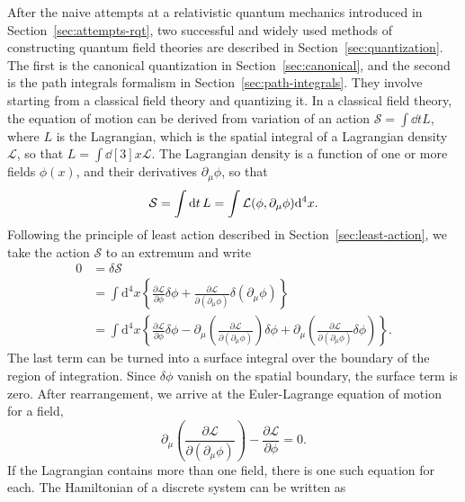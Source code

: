 After the naive attempts at a relativistic quantum mechanics introduced in Section~\ref{sec:attempts-rqt}, two successful and widely used methods of constructing quantum field theories are described in Section~\ref{sec:quantization}. The first is the canonical quantization in Section~\ref{sec:canonical}, and the second is the path integrals formalism in Section~\ref{sec:path-integrals}. They involve starting from a classical field theory and quantizing it. In a classical field theory, the equation of motion can be derived from variation of an action $\mathcal{S}=\int \dd{t}L$, where $L$ is the Lagrangian, which is the spatial integral of a Lagrangian density $\mathcal{L}$, so that $L=\int \dd[3]x\mathcal{L}$. The Lagrangian density is a function of one or more fields $\phi(x)$, and their derivatives $\partial_{\mu}\phi$, so that
\begin{equation}
\mathcal{S}=\int \dd{t}L=\int \mathcal{L}\qty(\phi,\partial_{\mu}\phi)\dd[4]x.
\end{equation}
Following the principle of least action described in Section~\ref{sec:least-action}, we  take the action $\mathcal{S}$ to an extremum and write
\begin{equation}
\begin{split}
0 & =  \delta \mathcal{S} \\
& = \int \mathrm{d}^4 x \left\lbrace \frac{\partial\mathcal{L}}{\partial\phi}\delta\phi + \frac{\partial\mathcal{L}}{\partial\left(\partial_\mu\phi\right)}\delta\left(\partial_\mu\phi\right) \right\rbrace \\
& = \int \mathrm{d}^4 x \left\lbrace \frac{\partial\mathcal{L}}{\partial\phi}\delta\phi - \partial_\mu \left(   \frac{\partial\mathcal{L}}{\partial\left(\partial_\mu\phi\right)} \right) \delta\phi   +   \partial_\mu \left(   \frac{\partial\mathcal{L}}{\partial\left(\partial_\mu\phi\right)}  \delta\phi \right) \right\rbrace .
\end{split}
\end{equation}
The last term can be turned into a surface integral over the boundary of the region of integration. Since $\delta\phi$ vanish on the spatial boundary, the surface term is zero. After rearrangement, we arrive at the Euler-Lagrange equation of motion for a field,  
\begin{equation}
\partial_\mu \left(   \frac{\partial\mathcal{L}}{\partial\left(\partial_\mu\phi\right)} \right) - \frac{\partial\mathcal{L}}{\partial\phi} = 0 .
\end{equation}
If the Lagrangian contains more than one field, there is one such equation for each. The Hamiltonian of a discrete system can be written as
